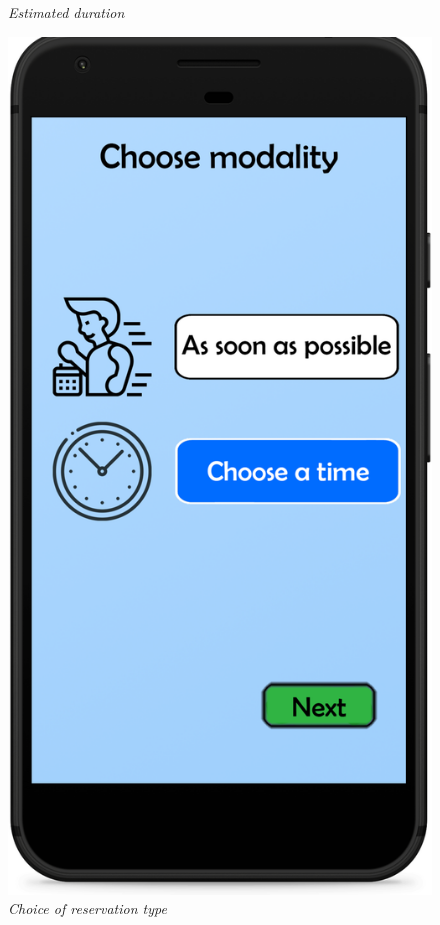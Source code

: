 \documentclass{article}
\begin{document}
\begin{figure}[!h]
\begin{minipage}[!h]{0.4\textwidth}
				\caption{\emph{Estimated duration}}
			\end{minipage}
			\hfill
			\begin{minipage}[!h]{0.4\textwidth}
				\includegraphics[width=\textwidth]{../Mockups/ChooseModality.png}
				\caption{\emph{Choice of reservation type}}
			\end{minipage}
		\end{figure}
	
\end{document}
